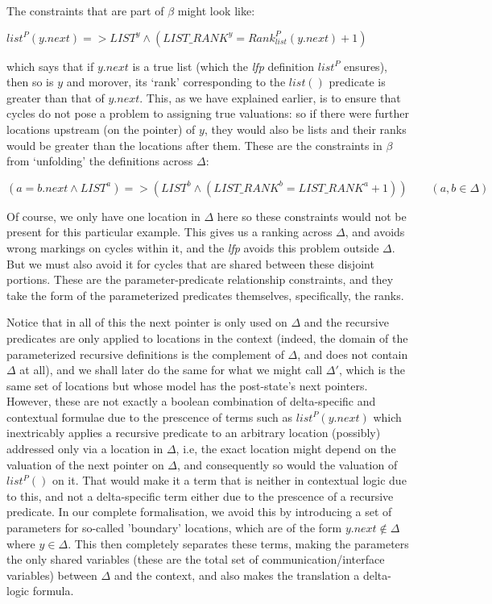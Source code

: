 \documentclass[acmsmall,review,anonymous]{acmart}\settopmatter{printfolios=true,printccs=false,printacmref=false}
\begin{document}
The constraints that are part of $\beta{}$ might look like:
\begin{center}
$list^{P}(y.next) => LIST^{y} \land{} \left(LIST\_RANK^{y} = Rank_{list}^{P}(y.next) + 1\right)$
\end{center}
which says that if $y.next$ is a true list (which the \textit{lfp} definition $list^{P}$ ensures), then so is $y$ and morover, its `rank' corresponding to the $list()$ predicate is greater than that of $y.next$. This, as we have explained earlier, is to ensure that cycles do not pose a problem to assigning true valuations: so if there were further locations upstream (on the pointer) of $y$, they would also be lists and their ranks would be greater than the locations after them. These are the constraints in $\beta{}$ from `unfolding' the definitions across $\Delta{}$:
\begin{center}
$\left(a = b.next \land{} LIST^{a}\right) => \left(LIST^{b} \land{} \left(LIST\_RANK^{b} = LIST\_RANK^{a} + 1\right)\right)\qquad{} (a,b \in{} \Delta{})$
\end{center}
Of course, we only have one location in $\Delta{}$ here so these constraints would not be present for this particular example. 
This gives us a ranking across $\Delta{}$, and avoids wrong markings on cycles within it, and the \textit{lfp} avoids this problem outside $\Delta{}$. But we must also avoid it for cycles that are shared between these disjoint portions. These are the parameter-predicate relationship constraints, and they take the form of the parameterized predicates themselves, specifically, the ranks.

Notice that in all of this the next pointer is only used on $\Delta{}$ and the recursive predicates are only applied to locations in the context (indeed, the domain of the parameterized recursive definitions is the complement of $\Delta{}$, and does not contain $\Delta{}$ at all), and we shall later do the same for what we might call $\Delta{}'$, which is the same set of locations but whose model has the post-state's next pointers. However, these are not exactly a boolean combination of delta-specific and contextual formulae due to the prescence of terms such as $list^{P}(y.next)$ which inextricably applies a recursive predicate to an arbitrary location (possibly) addressed only via a location in $\Delta{}$, i.e, the exact location might depend on the valuation of the next pointer on $\Delta{}$, and consequently so would the valuation of $list^{P}()$ on it. That would make it a term that is neither in contextual logic due to this, and not a delta-specific term either due to the prescence of a recursive predicate. In our complete formalisation, we avoid this by introducing a set of parameters for so-called 'boundary' locations, which are of the form $y.next \notin{} \Delta{}$ where $y \in{} \Delta{}$. This then completely separates these terms, making the parameters the only shared variables (these are the total set of communication/interface variables) between $\Delta{}$ and the context, and also makes the translation a delta-logic formula.
\end{document}
